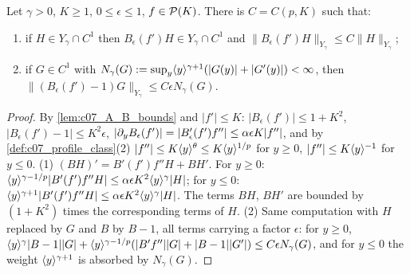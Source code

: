 \begin{lemma}
  \label{lem:c07_B_conversion}
  Let $\gamma>0$, $K\ge1$, $0\le\epsilon\le1$, $f\in\mathcal{P}(K)$. There is $C=C(p,K)$ such that:
  \begin{enumerate}
    \item if $H\in Y_\gamma\cap C^1$ then $B_\epsilon(f')H\in Y_\gamma\cap C^1$ and $\|B_\epsilon(f')H\|_{Y_\gamma}\le C\|H\|_{Y_\gamma}$;
    \item if $G\in C^1$ with $N_\gamma(G):=\sup_y\langle y \rangle^{\gamma+1}(|G(y)|+|G'(y)|)<\infty$, then
      $\|(B_\epsilon(f')-1)G\|_{Y_\gamma}\le C\epsilon N_\gamma(G)$.
  \end{enumerate}
\end{lemma}
\begin{proof}
  By \cref{lem:c07_A_B_bounds} and $|f'|\le K$: $|B_\epsilon(f')|\le1+K^2$, $|B_\epsilon(f')-1|\le K^2\epsilon$,
  $|\partial_y B_\epsilon(f')|=|B_\epsilon'(f')f''|\le\alpha\epsilon K|f''|$, and by \cref{def:c07_profile_class}(2)
  $|f''|\le K\langle y \rangle^{\theta}\le K\langle y \rangle^{1/p}$ for $y\ge0$, $|f''|\le K\langle y \rangle^{-1}$ for $y\le0$.
  (1) $(B H)'=B'(f')f''H+BH'$. For $y\ge0$:
  $\langle y \rangle^{\gamma-1/p}|B'(f')f''H|\le\alpha\epsilon K^2\langle y \rangle^{\gamma}|H|$; for $y\le0$:
  $\langle y \rangle^{\gamma+1}|B'(f')f''H|\le\alpha\epsilon K^2\langle y \rangle^\gamma|H|$. The terms $BH$, $BH'$ are bounded by $(1+K^2)$ times the corresponding terms of $H$.
  (2) Same computation with $H$ replaced by $G$ and $B$ by $B-1$, all terms carrying a factor $\epsilon$:
  for $y\geq0$, $\langle y \rangle^{\gamma}|B-1||G|+\langle y \rangle^{\gamma-1/p}(|B'f''||G|+|B-1||G'|)\le C\epsilon N_\gamma(G)$,
  and for $y\le0$ the weight $\langle y \rangle^{\gamma+1}$ is absorbed by $N_\gamma(G)$.
\end{proof}

